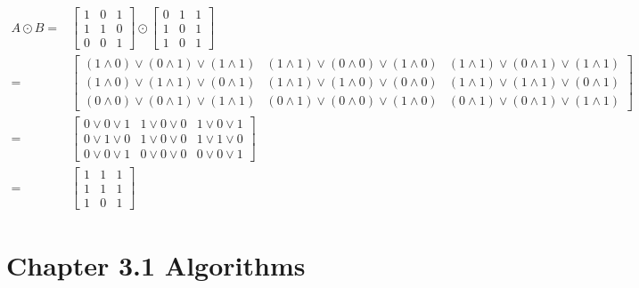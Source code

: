 \documentclass[12pt]{article}
\begin{document}
    \begin{equation}
        \begin{split}
            A \odot B =&
            \begin{bmatrix}
                1 & 0 & 1 \\
                1 & 1 & 0 \\
                0 & 0 & 1
            \end{bmatrix}
                \odot
            \begin{bmatrix}
                0 & 1 & 1\\
                1 & 0 & 1\\
                1 & 0 & 1
            \end{bmatrix}\\
            =&
            \begin{bmatrix}
                (1\wedge 0) \vee (0\wedge1) \vee (1\wedge1) & (1\wedge1) \vee (0\wedge0) \vee (1\wedge0) & (1\wedge1) \vee (0\wedge1) \vee (1\wedge1) \\
                (1\wedge0) \vee (1\wedge1) \vee (0\wedge1) & (1\wedge1) \vee (1\wedge0) \vee (0\wedge0) & (1\wedge1) \vee (1\wedge1) \vee (0\wedge1) \\
                (0\wedge0) \vee (0\wedge1) \vee (1\wedge1) & (0\wedge1) \vee (0\wedge0) \vee (1\wedge0) & (0\wedge1) \vee (0\wedge1) \vee (1\wedge1)
            \end{bmatrix}\\
            =&
            \begin{bmatrix}
                0\vee0\vee1&1\vee0\vee0&1\vee0\vee1\\
                0\vee1\vee0&1\vee0\vee0&1\vee1\vee0\\
                0\vee0\vee1&0\vee0\vee0&0\vee0\vee1
            \end{bmatrix}\\
            =&
            \begin{bmatrix}
                1&1&1\\
                1&1&1\\
                1&0&1
            \end{bmatrix}
        \end{split}
    \end{equation}

    \pagebreak
    \section{Chapter 3.1 Algorithms}
\end{document}
